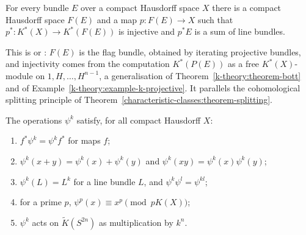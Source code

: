 \begin{theorem}\label{k-theory:theorem-k-splitting}
For every bundle $E$ over a compact Hausdorff space $X$ there is a compact Hausdorff space $F(E)$ and a map $p \colon F(E) \to X$ such that $p^* \colon K^*(X) \to K^*(F(E))$ is injective and $p^*E$ is a sum of line bundles.
\end{theorem}

This is \cite[Chapter 2]{hatcher-vbkt} or \cite{atiyah-k-theory}: $F(E)$ is the flag bundle, obtained by iterating projective bundles, and injectivity comes from the computation $K^*(P(E))$ as a free
$K^*(X)$-module on $1, H, \ldots, H^{n-1}$, a generalisation of Theorem~\ref{k-theory:theorem-bott} and of Example~\ref{k-theory:example-k-projective}. It parallels the cohomological splitting principle of
Theorem~\ref{characteristic-classes:theorem-splitting}.

\begin{theorem}\label{k-theory:theorem-adams-operations}
The operations $\psi^k$ satisfy, for all compact Hausdorff $X$:
\begin{enumerate}
\item $f^*\psi^k = \psi^kf^*$ for maps $f$;
\item $\psi^k(x + y) = \psi^k(x) + \psi^k(y)$ and $\psi^k(xy) = \psi^k(x)\psi^k(y)$;
\item $\psi^k(L) = L^k$ for a line bundle $L$, and $\psi^k\psi^l = \psi^{kl}$;
\item for a prime $p$, $\psi^p(x) \equiv x^p \pmod{pK(X)}$;
\item $\psi^k$ acts on $\tilde{K}(S^{2n})$ as multiplication by $k^n$.
\end{enumerate}
\end{theorem}

